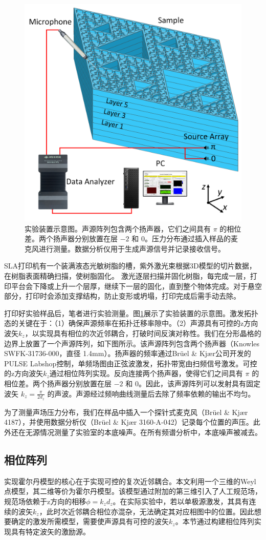 \begin{figure}[htbp]
    \centering
    \includegraphics[width=0.5\linewidth]{figure/FracHaldExp/ExpSetup.png}
    \caption{实验装置示意图。声源阵列包含两个扬声器，它们之间具有 $\pi$ 的相位差。两个扬声器分别放置在层 $-2$ 和 $0$。压力分布通过插入样品的麦克风进行测量。数据分析仪用于生成声源信号并记录接收信号。}
    \label{fig:ExpSetup}
\end{figure}

SLA打印机有一个装满液态光敏树脂的槽，紫外激光束根据3D模型的切片数据，在树脂表面精确扫描，使树脂固化。 激光逐层扫描并固化树脂，每完成一层，打印平台会下降或上升一个层厚，继续下一层的固化，直到整个物体完成。对于悬空部分，打印时会添加支撑结构，防止变形或坍塌，打印完成后需手动去除。

打印好实验样品后，笔者进行实验测量。图\ref{fig:ExpSetup}展示了实验装置的示意图。激发拓扑态的关键在于：（1）确保声源频率在拓扑迁移率隙中。（2）声源具有可控的z方向波矢$k_z$，以实现具有相位的次近邻耦合，打破时间反演对称性。我们在分形晶格的边界上放置了一个声源阵列，如下图所示。该声源阵列包含两个扬声器（Knowles SWFK-31736-000，直径 1.4mm）。扬声器的频率通过Brüel \& Kjær公司开发的PULSE Labshop控制，单频场图由正弦波激发，拓扑带宽由扫频信号激发。可控的z方向波矢$k_z$通过相位阵列实现。反向连接两个扬声器，使得它们之间具有 $\pi$ 的相位差。两个扬声器分别放置在层 $-2$ 和 $0$。因此，该声源阵列可以发射具有固定波矢 $k_z = \frac{\pi}{2d_z}$ 的声波。声源经过频响曲线测量后去除了频率依赖的输出不均匀。

为了测量声场压力分布，我们在样品中插入一个探针式麦克风（Brüel \& Kjær 4187），并使用数据分析仪（Brüel \& Kjær 3160-A-042）记录每个位置的声压。此外还在无源情况测量了实验室的本底噪声。在所有频谱分析中，本底噪声被减去。

\subsection{相位阵列}
实现霍尔丹模型的核心在于实现可控的复次近邻耦合。本文利用一个三维的Weyl点模型，其二维等价为霍尔丹模型。该模型通过附加的第三维引入了人工规范场，规范场依赖于z方向的相移$\phi=k_zd_z$。在实际实验中，若以单极源激发，其具有连续的波矢$k_z$，此时次近邻耦合相位亦混杂，无法确定其对应相图中的位置。因此想要确定的激发所需模型，需要使声源具有可控的波矢$k_z$。本节通过构建相位阵列实现具有特定波矢的激励源。

